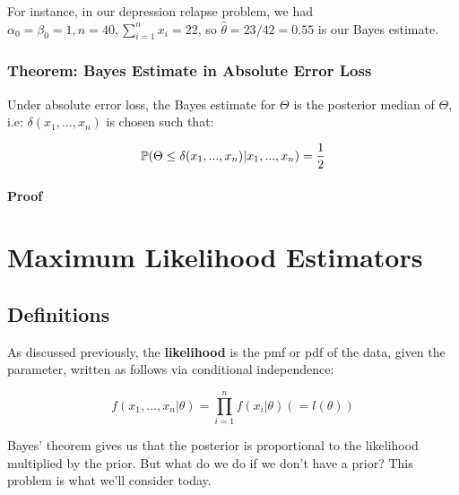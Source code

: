 \documentclass[a4paper]{article}
\begin{document}
                For instance, in our depression relapse problem, we had
                $\alpha_0 = \beta_0 = 1, n = 40, \sum\limits_{i=1}^n x_i = 22$,
                so $\widehat \theta = 23/42 = 0.55$ is our Bayes estimate.

            \subsubsection{Theorem: Bayes Estimate in Absolute Error Loss}
                Under absolute error loss, the Bayes estimate for $\Theta$ is
                the posterior median of $\Theta$, i.e: $\delta(x_1, ..., x_n)$
                is chosen such that:

                \[
                    \mathbb{P}(\Theta \leq \delta(x_1, ..., x_n) | x_1, ..., x_n) =
                    \frac{1}{2}
                \]

                \paragraph{Proof}
                    \begin{fread}
                        [DS12, theorem 4.5.3]
                    \end{fread}

    \newpage
    \section{Maximum Likelihood Estimators}
        \subsection{Definitions}
        As discussed previously, the \textbf{likelihood} is the pmf or pdf of
        the data, given the parameter, written as follows via conditional
        independence:

        \[
            f(x_1, ..., x_n | \theta) = \prod_{i=1}^n f(x_i | \theta)
            (=l(\theta))
        \]

        Bayes' theorem gives us that the posterior is proportional to the
        likelihood multiplied by the prior. But what do we do if we don't have a
        prior? This problem is what we'll consider today.
\end{document}
